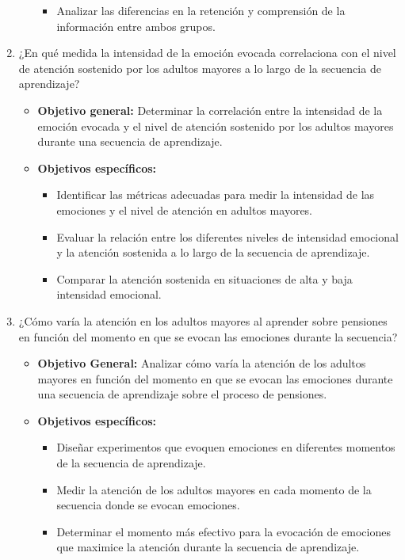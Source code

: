 \begin{enumerate}
\begin{itemize}
\begin{itemize}
            \item Analizar las diferencias en la retención y comprensión de la información entre ambos grupos.
        \end{itemize}
    \end{itemize}
    \item ¿En qué medida la intensidad de la emoción evocada correlaciona con el nivel de atención sostenido por los adultos mayores a lo largo de la secuencia de aprendizaje?
    \begin{itemize}
        \item \textbf{Objetivo general:} Determinar la correlación entre la intensidad de la emoción evocada y el nivel de atención sostenido por los adultos mayores durante una secuencia de aprendizaje.
        \item \textbf{Objetivos específicos:}
        \begin{itemize}
            \item Identificar las métricas adecuadas para medir la intensidad de las emociones y el nivel de atención en adultos mayores.
            \item Evaluar la relación entre los diferentes niveles de intensidad emocional y la atención sostenida a lo largo de la secuencia de aprendizaje.
            \item Comparar la atención sostenida en situaciones de alta y baja intensidad emocional.
        \end{itemize}    
    \end{itemize}
    \item ¿Cómo varía la atención en los adultos mayores al aprender sobre pensiones en función del momento en que se evocan las emociones durante la secuencia?
    \begin{itemize}
        \item \textbf{Objetivo General:} Analizar cómo varía la atención de los adultos mayores en función del momento en que se evocan las emociones durante una secuencia de aprendizaje sobre el proceso de pensiones.
        \item \textbf{Objetivos específicos:}
        \begin{itemize}
            \item Diseñar experimentos que evoquen emociones en diferentes momentos de la secuencia de aprendizaje.
            \item Medir la atención de los adultos mayores en cada momento de la secuencia donde se evocan emociones.
            \item Determinar el momento más efectivo para la evocación de emociones que maximice la atención durante la secuencia de aprendizaje.
        \end{itemize}
    \end{itemize}
\end{enumerate}



